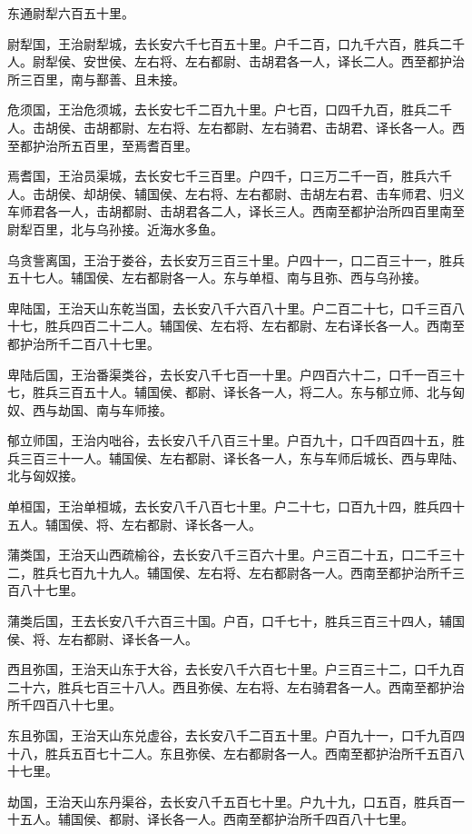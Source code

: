 \documentclass[]{article}
\begin{document}
东通尉犁六百五十里。

尉犁国，王治尉犁城，去长安六千七百五十里。户千二百，口九千六百，胜兵二千人。尉犁侯、安世侯、左右将、左右都尉、击胡君各一人，译长二人。西至都护治所三百里，南与鄯善、且未接。

危须国，王治危须城，去长安七千二百九十里。户七百，口四千九百，胜兵二千人。击胡侯、击胡都尉、左右将、左右都尉、左右骑君、击胡君、译长各一人。西至都护治所五百里，至焉耆百里。

焉耆国，王治员渠城，去长安七千三百里。户四千，口三万二千一百，胜兵六千人。击胡侯、却胡侯、辅国侯、左右将、左右都尉、击胡左右君、击车师君、归义车师君各一人，击胡都尉、击胡君各二人，译长三人。西南至都护治所四百里南至尉犁百里，北与乌孙接。近海水多鱼。

乌贪訾离国，王治于娄谷，去长安万三百三十里。户四十一，口二百三十一，胜兵五十七人。辅国侯、左右都尉各一人。东与单桓、南与且弥、西与乌孙接。

卑陆国，王治天山东乾当国，去长安八千六百八十里。户二百二十七，口千三百八十七，胜兵四百二十二人。辅国侯、左右将、左右都尉、左右译长各一人。西南至都护治所千二百八十七里。

卑陆后国，王治番渠类谷，去长安八千七百一十里。户四百六十二，口千一百三十七，胜兵三百五十人。辅国侯、都尉、译长各一人，将二人。东与郁立师、北与匈奴、西与劫国、南与车师接。

郁立师国，王治内咄谷，去长安八千八百三十里。户百九十，口千四百四十五，胜兵三百三十一人。辅国侯、左右都尉、译长各一人，东与车师后城长、西与卑陆、北与匈奴接。

单桓国，王治单桓城，去长安八千八百七十里。户二十七，口百九十四，胜兵四十五人。辅国侯、将、左右都尉、译长各一人。

蒲类国，王治天山西疏榆谷，去长安八千三百六十里。户三百二十五，口二千三十二，胜兵七百九十九人。辅国侯、左右将、左右都尉各一人。西南至都护治所千三百八十七里。

蒲类后国，王去长安八千六百三十国。户百，口千七十，胜兵三百三十四人，辅国侯、将、左右都尉、译长各一人。

西且弥国，王治天山东于大谷，去长安八千六百七十里。户三百三十二，口千九百二十六，胜兵七百三十八人。西且弥侯、左右将、左右骑君各一人。西南至都护治所千四百八十七里。

东且弥国，王治天山东兑虚谷，去长安八千二百五十里。户百九十一，口千九百四十八，胜兵五百七十二人。东且弥侯、左右都尉各一人。西南至都护治所千五百八十七里。

劫国，王治天山东丹渠谷，去长安八千五百七十里。户九十九，口五百，胜兵百一十五人。辅国侯、都尉、译长各一人。西南至都护治所千四百八十七里。
\end{document}

